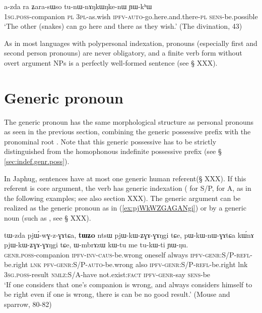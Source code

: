 \begin{exe}
\ex \label{ex:ʑara.sWso}
\gll a-zda ra ʑara-sɯso tu-nɯ-nɤŋkɯŋke-nɯ ɲɯ-kʰɯ \\
\textsc{1sg.poss}-companion \textsc{pl} \textsc{3pl}-as.wish \textsc{ipfv}-\textsc{auto}-go.here.and.there-\textsc{pl} \textsc{sens}-be.possible \\
\glt `The other (snakes) can go here and there as they wish.' (The divination, 43)
\end{exe}

As in most languages with polypersonal indexation, pronouns (especially first and second person pronouns) are never obligatory, and a finite verb form without overt argument NPs is a perfectly well-formed sentence (see § XXX). 

\section{Generic pronoun}  \label{sec:genr.pro}
The generic pronoun  has the same morphological structure as personal pronouns as seen in the previous section, combining the generic possessive prefix  with the pronominal root . Note that this generic possessive has to be strictly distinguished from the homophonous indefinite possessive prefix  (see § \ref{sec:indef.genr.poss}).

In Japhug, sentences have at most one generic human referent(§ XXX). If this referent is core argument, the verb has generic indexation ( for S/P,  for A, as in the following examples; see also section XXX). The generic argument can be realized as the generic pronoun  as in (\ref{ex:pjWkWZGAGANgi}) or by a generic noun (such as , see § XXX).

\begin{exe}
\ex \label{ex:pjWkWZGAGANgi}
\gll tɯ-zda pjɯ́-wɣ-z-ɣɤtɕa, \textbf{tɯʑo}  ntsɯ  pjɯ-kɯ-ʑɣɤ-ɣɤŋgi   	tɕe,  pɯ-kɯ-nɯ-ɣɤtɕa 	kɯ́nɤ   	pjɯ-kɯ-ʑɣɤ-ɣɤŋgi   	tɕe,    ɯ-mbrɤzɯ   	kɯ-tu   	me  	tu-kɯ-ti   	ɲɯ-ŋu.   \\
\textsc{genr.poss}-companion \textsc{ipfv-inv-caus}-be.wrong oneself always \textsc{ipfv-genr:S/P-refl}-be.right \textsc{lnk} \textsc{pfv-genr:S/P-auto}-be.wrong also \textsc{ipfv-genr:S/P-refl}-be.right lnk \textsc{3sg.poss}-result \textsc{nmlz:S/A}-have  not.exist:\textsc{fact} \textsc{ipfv-genr}-say \textsc{sens}-be \\
\glt  `If one considers that one's companion is wrong, and always considers himself to be right even if one is wrong, there is can be no good result.' (Mouse and sparrow, 80-82)
\end{exe} 

